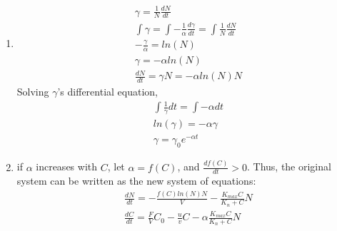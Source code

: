 \begin{homeworkProblem}[25]
\begin{enumerate}
    \item
    \begin{align*}
        \gamma = \frac{1}{N}\frac{dN}{dt} \\
        \int \gamma = \int {-\frac{1}{\alpha}\frac{d\gamma}{dt}} = \int \frac{1}{N}\frac{dN}{dt} \\
        -\frac{\gamma}{\alpha} = ln(N) \\
        \gamma = -\alpha ln(N) \\
        \frac{dN}{dt} = \gamma N = -\alpha ln(N) N
    \end{align*}
    Solving $\gamma$'s differential equation, \begin{align*}
        \int \frac{1}{\gamma}dt = \int -\alpha dt \\
        ln(\gamma) = -\alpha \gamma \\
        \gamma = \gamma_{0}e^{-\alpha t}
    \end{align*}
    
    \item
    if $\alpha$ increases with $C$, let $\alpha = f(C)$, and $\frac{df(C)}{dt} > 0 $. Thus, the original system can be written as the new system of equations: \begin{align*}
        \frac{dN}{dt} = -\frac{f(C)ln(N)N}{V} - \frac{K_{max}C}{K_n + C}N \\
        \frac{dC}{dt} = \frac{F}{V}C_0 - \frac{u}{v}C - \alpha\frac{K_{max}C}{K_n +C}N 
    \end{align*}
\end{enumerate}
\end{homeworkProblem}
